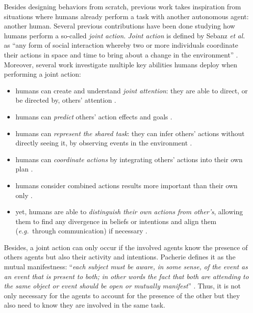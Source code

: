 \documentclass[a4paper,11pt,twoside]{StyleThese}
\begin{document}
Besides designing behaviors from scratch, previous work takes inspiration from situations where humans already perform a task with another autonomous agent: another human. Several previous contributions have been done studying how humans perform a so-called \textit{joint action}. \textit{Joint action} is defined by Sebanz \textit{et al.} as ``any form of social interaction whereby two or more individuals coordinate their actions in space and time to bring about a change in the environment'' \cite{sebanz2006joint}. Moreover, several work investigate multiple key abilities humans deploy when performing a joint action:
\begin{itemize}
\item humans can create and understand \textit{joint attention}: they are able to direct, or be directed by, others' attention \cite{pacherie_phenomenology_2011, sebanz2006joint}.
\item humans can \textit{predict} others' action effects and goals \cite{tomasello2005understanding, sebanz2006joint}.
\item humans can \textit{represent the shared task}: they can infer others' actions without directly seeing it, by observing events in the environment \cite{knoblich2011psychological, sebanz2006joint}.
\item humans can \textit{coordinate actions} by integrating others' actions into their own plan \cite{sebanz2006joint}.
\item humans consider combined actions results more important than their own only \cite{sebanz2006joint}.
\item yet, humans are able to \textit{distinguish their own actions from other's}, allowing them to find any divergence in beliefs or intentions and align them (\textit{e.g.}~through communication) if necessary \cite{pacherie_phenomenology_2011}.
\end{itemize}

Besides, a joint action can only occur if the involved agents know the presence of others agents but also their activity and intentions. Pacherie defines it as the mutual manifestness: ``\textit{each subject must be aware, in some sense, of the event as an event that is present to both; in other words the fact that both are attending to the same object or event should be open or mutually manifest}'' \cite{pacherie_phenomenology_2011}. Thus, it is not only necessary for the agents to account for the presence of the other but they also need to know they are involved in the same task.
\end{document}
